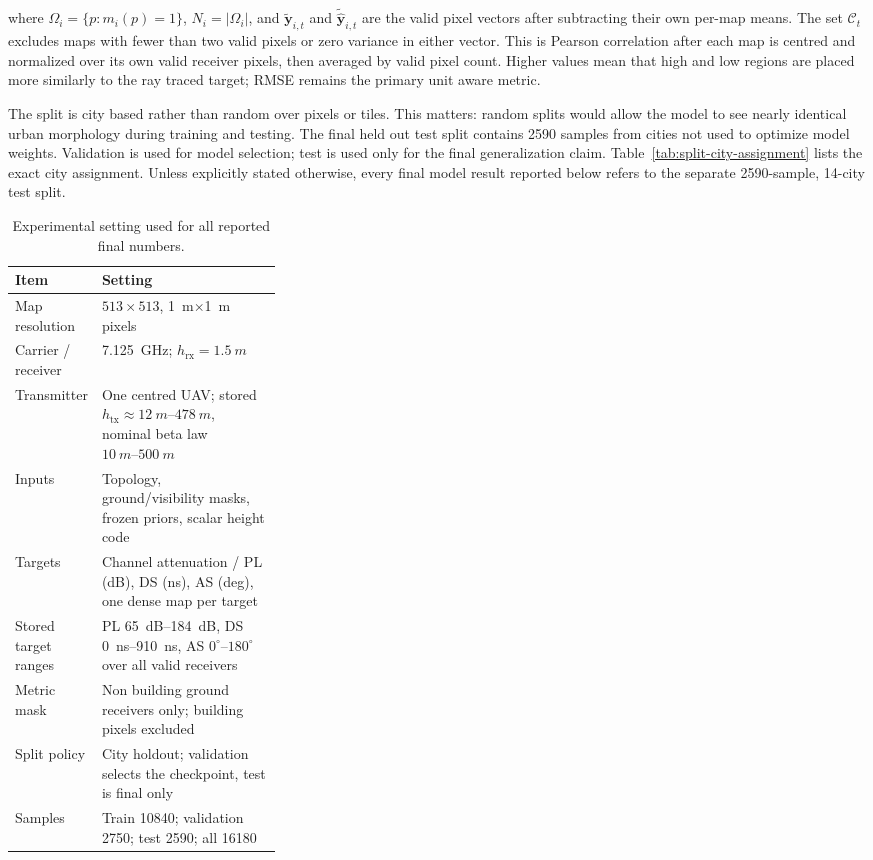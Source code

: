 \documentclass[journal]{IEEEtran}
\begin{document}
where \(\Omega_i=\{p:m_i(p)=1\}\), \(N_i=|\Omega_i|\), and
\(\tilde{\mathbf y}_{i,t}\) and \(\tilde{\hat{\mathbf y}}_{i,t}\) are the valid
pixel vectors after subtracting their own per-map means. The set
\(\mathcal{C}_t\) excludes maps with fewer than two valid pixels or zero
variance in either vector. This is Pearson correlation after each map is centred
and normalized over its own valid receiver pixels, then averaged by valid pixel
count. Higher values mean that high and low regions are placed more similarly
to the ray traced target; RMSE remains the primary unit aware metric.

The split is city based rather than random over pixels or tiles. This matters:
random splits would allow the model to see nearly identical urban morphology
during training and testing. The final held out test split contains 2590
samples from cities not used to optimize model weights. Validation is used for
model selection; test is used only for the final generalization claim.
Table~\ref{tab:split-city-assignment} lists the exact city assignment.
Unless explicitly stated otherwise, every final model result reported below
refers to the separate 2590-sample, 14-city test split.

\begin{table}[!t]
\centering
\caption{Experimental setting used for all reported final numbers.}
\label{tab:experimental-setting}
\scriptsize
\setlength{\tabcolsep}{4pt}
\begin{tabularx}{\linewidth}{p{0.31\linewidth}X}
\toprule
Item & Setting \\
\midrule
Map resolution & \(513\times513\), \SI{1}{m}\(\times\)\SI{1}{m} pixels \\
Carrier / receiver & \SI{7.125}{GHz}; \(h_{\mathrm{rx}}=\SI{1.5}{m}\) \\
Transmitter & One centred UAV; stored \(h_{\mathrm{tx}}\approx\SIrange{12}{478}{m}\), nominal beta law \(\SIrange{10}{500}{m}\) \\
Inputs & Topology, ground/visibility masks, frozen priors, scalar height code \\
Targets & Channel attenuation / PL (dB), DS (ns), AS (deg), one dense map per target \\
Stored target ranges & PL \SIrange{65}{184}{dB}, DS \SIrange{0}{910}{ns}, AS \(0^\circ\)--\(180^\circ\) over all valid receivers \\
Metric mask & Non building ground receivers only; building pixels excluded \\
Split policy & City holdout; validation selects the checkpoint, test is final only \\
Samples & Train 10840; validation 2750; test 2590; all 16180 \\
\bottomrule
\end{tabularx}
\end{table}
\end{document}
